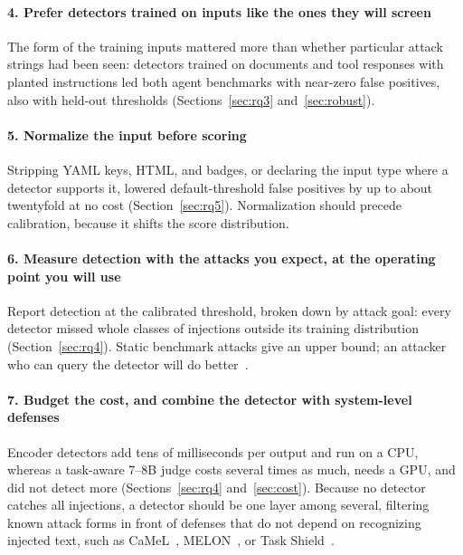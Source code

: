 \paragraph{4. Prefer detectors trained on inputs like the ones they will screen}
The form of the training inputs mattered more than whether particular attack strings had been seen: detectors trained on documents and tool responses with planted instructions led both agent benchmarks with near-zero false positives, also with held-out thresholds (Sections~\ref{sec:rq3} and~\ref{sec:robust}).

\paragraph{5. Normalize the input before scoring}
Stripping YAML keys, HTML, and badges, or declaring the input type where a detector supports it, lowered default-threshold false positives by up to about twentyfold at no cost (Section~\ref{sec:rq5}). Normalization should precede calibration, because it shifts the score distribution.

\paragraph{6. Measure detection with the attacks you expect, at the operating point you will use}
Report detection at the calibrated threshold, broken down by attack goal: every detector missed whole classes of injections outside its training distribution (Section~\ref{sec:rq4}). Static benchmark attacks give an upper bound; an attacker who can query the detector will do better~\cite{attackermovessecond,zhan2025adaptive}.

\paragraph{7. Budget the cost, and combine the detector with system-level defenses}
Encoder detectors add tens of milliseconds per output and run on a CPU, whereas a task-aware 7--8B judge costs several times as much, needs a GPU, and did not detect more (Sections~\ref{sec:rq4} and~\ref{sec:cost}). Because no detector catches all injections, a detector should be one layer among several, filtering known attack forms in front of defenses that do not depend on recognizing injected text, such as CaMeL~\cite{camel}, MELON~\cite{melon}, or Task Shield~\cite{taskshield}.


